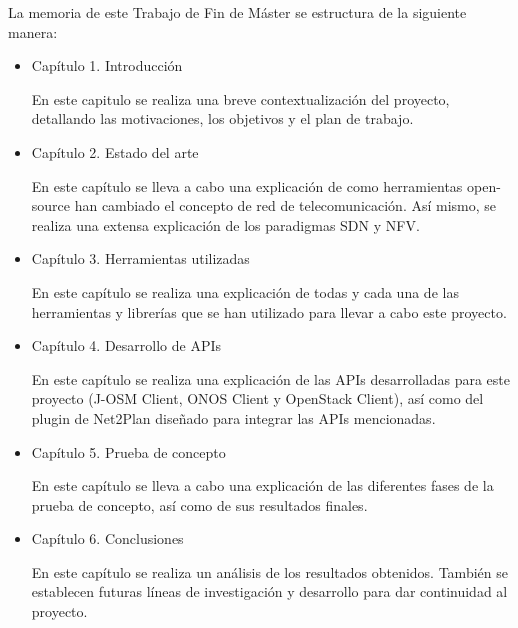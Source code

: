 La memoria de este Trabajo de Fin de Máster se estructura de la siguiente manera:
\begin{itemize}
	
	\item Capítulo 1. Introducción
	
	En este capitulo se realiza una breve contextualización del proyecto, detallando las motivaciones, los objetivos y el plan de trabajo.
	
	\item Capítulo 2. Estado del arte
	
	En este capítulo se lleva a cabo una explicación de como herramientas open-source han cambiado el concepto de red de telecomunicación. Así mismo, se realiza una extensa explicación de los paradigmas SDN y NFV.
	
	\item Capítulo 3. Herramientas utilizadas
	
	En este capítulo se realiza una explicación de todas y cada una de las herramientas y librerías que se han utilizado para llevar a cabo este proyecto.
	
	\item Capítulo 4. Desarrollo de APIs
	
	En este capítulo se realiza una explicación de las APIs desarrolladas para este proyecto (J-OSM Client, ONOS Client y OpenStack Client), así como del plugin de Net2Plan diseñado para integrar las APIs mencionadas.
	
	\item Capítulo 5. Prueba de concepto
	
	En este capítulo se lleva a cabo una explicación de las diferentes fases de la prueba de concepto, así como de sus resultados finales.
	
	\item Capítulo 6. Conclusiones
	
	En este capítulo se realiza un análisis de los resultados obtenidos. También se establecen futuras líneas de investigación y desarrollo para dar continuidad al proyecto.
	
	
\end{itemize}
\cleardoublepage
	
